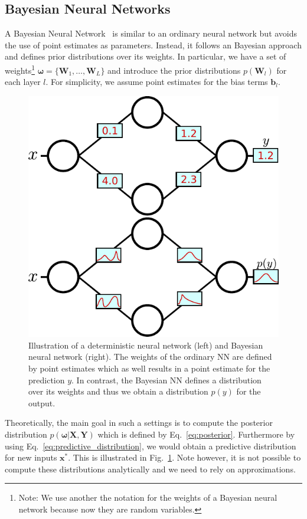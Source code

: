 \documentclass[runningheads]{llncs}
\begin{document}
\subsection{Bayesian Neural Networks}
\label{sec:bayesian_neural_networks}
A Bayesian Neural Network~\cite{mackay1992practical,Neal:1995:BLN:922680} is similar to an ordinary neural network but avoids the use of point estimates as parameters. 
Instead, it follows an Bayesian approach and defines prior distributions over its weights. 
In particular, we have a set of weights\footnote{Note: We use another the notation for the weights of a Bayesian neural network because now they are random variables.} $\boldsymbol{\omega} = \{\mathbf{W}_1,\ldots, \mathbf{W}_L\}$ and introduce the prior distributions $p(\mathbf{W}_l)$ for each layer $l$. 
For simplicity, we assume point estimates for the bias terms $\mathbf{b}_l$. 
\begin{figure}
    \centering
    \includegraphics[width=.5\textwidth]{images/BayesianNeuralNetwork.pdf}
    \caption{Illustration of a deterministic neural network (left) and Bayesian neural network (right). The weights of the ordinary NN are defined by point estimates which as well results in a point estimate for the prediction $y$. In contrast, the Bayesian NN defines a distribution over its weights and thus we obtain a distribution $p(y)$ for the output.}
    \label{fig:bayesian_neural_network}
\end{figure}

Theoretically, the main goal in such a settings is to compute the posterior distribution $p\left(\boldsymbol{\omega} | \mathbf{X}, \mathbf{Y} \right)$ which is defined by Eq.~\ref{eq:posterior}.
Furthermore by using Eq.~\ref{eq:predictive_distribution}, we would obtain a predictive distribution for new inputs $\mathbf{x}^*$.
This is illustrated in Fig.~\ref{fig:bayesian_neural_network}.
Note however, it is not possible to compute these distributions analytically and we need to rely on approximations.
\end{document}
